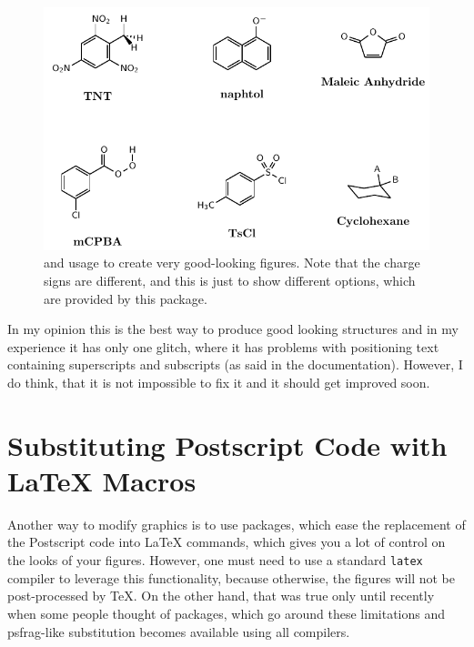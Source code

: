 \documentclass[
]{scrartcl}
\begin{document}
\begin{figure}[htpb]
    \centering
    \includegraphics{fig5.pdf}
%    
    \caption{
     and  usage to create very good-looking
        figures.
    Note that the charge signs are different, and this is just to
        show different options, which are provided by this package.}
    \label{fig:chemfig}
\end{figure}

%
In my opinion this is the best way to produce good looking structures and in my
    experience it has only one glitch, where it has problems with positioning
    text containing superscripts and subscripts (as said in the documentation).
%
However, I do think, that it is not impossible to fix it and it should get
    improved soon.

\clearpage
\section{Substituting Postscript Code with \LaTeX{} Macros}

%
Another way to modify graphics is to use packages, which ease the replacement of
    the Postscript code into \LaTeX{} commands, which gives you a lot of control
    on the looks of your figures.
%
However, one must need to use a standard \verb|latex| compiler to leverage this
    functionality, because otherwise, the  figures will not be
    post-processed by \TeX{}.
%
On the other hand, that was true only until recently when some people thought of
    packages, which go around these limitations and psfrag-like substitution
    becomes available using all compilers.
\end{document}
